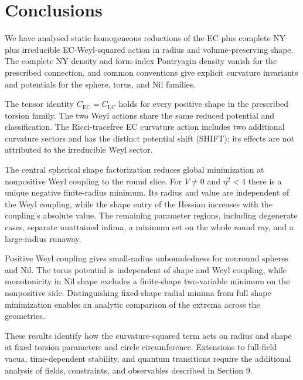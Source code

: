 \section{Conclusions}
\label{sec:revised10}

We have analysed static homogeneous reductions of the EC plus complete NY plus irreducible EC-Weyl-squared action in radius and volume-preserving shape. The complete NY density and form-index Pontryagin density vanish for the prescribed connection, and common conventions give explicit curvature invariants and potentials for the sphere, torus, and Nil families.

The tensor identity $C_{\mathrm{EC}}=C_{\mathrm{LC}}$ holds for every positive shape
in the prescribed torsion family. The two Weyl actions share the same reduced potential and
classification. The Ricci-tracefree EC curvature action includes two additional
curvature sectors and has the distinct potential shift (SHIFT); its effects
are not attributed to the irreducible Weyl sector.

The central spherical shape factorization reduces global minimization at nonpositive Weyl coupling to the round slice. For $V\ne0$ and $\eta^2<4$ there is a unique negative finite-radius minimum. Its radius and value are independent of the Weyl coupling, while the shape entry of the Hessian increases with the coupling's absolute value. The remaining parameter regions, including degenerate cases, separate unattained infima, a minimum set on the whole round ray, and a large-radius runaway.

Positive Weyl coupling gives small-radius unboundedness for nonround spheres and Nil. The torus potential is independent of shape and Weyl coupling, while monotonicity in Nil shape excludes a finite-shape two-variable minimum on the nonpositive side. Distinguishing fixed-shape radial minima from full shape minimization enables an analytic comparison of the extrema across the geometries.

These results identify how the curvature-squared term acts on radius and shape at fixed torsion parameters and circle circumference. Extensions to full-field vacua, time-dependent stability, and quantum transitions require the additional analysis of fields, constraints, and observables described in Section 9.
